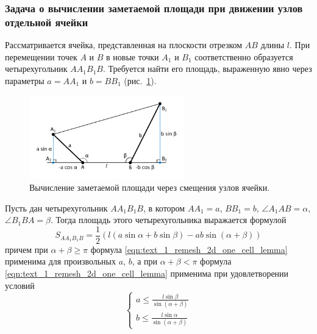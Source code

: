 \subsubsection{Задача о вычислении заметаемой площади при движении узлов отдельной ячейки}

Рассматривается ячейка, представленная на плоскости отрезком $AB$ длины $l$.
При перемещении точек $A$ и $B$ в новые точки $A_1$ и $B_1$ соответственно образуется четырехугольник $AA_1B_1B$.
Требуется найти его площадь, выраженную явно через параметры $a = AA_1$ и $b = BB_1$ (рис.~\ref{fig:text_1_remesh_2d_local}).

\begin{figure}[ht]
\centering
\includegraphics[width=0.6\textwidth]{pics/text_1_remesh_2d/local.pdf}
\singlespacing
{}\caption{Вычисление заметаемой площади через смещения узлов ячейки.}
\label{fig:text_1_remesh_2d_local}
\end{figure}

\begin{lemma}
Пусть дан четырехугольник $AA_1B_1B$, в котором $AA_1 = a$, $BB_1 = b$, $\angle A_1AB = \alpha$, $\angle B_1BA = \beta$.
Тогда площадь этого четырехугольника выражается формулой
\begin{equation}\label{eqn:text_1_remesh_2d_one_cell_lemma}
S_{AA_1B_1B} = \frac{1}{2} \left( l (a \sin \alpha + b \sin \beta) - ab \sin (\alpha + \beta) \right)
\end{equation}
причем при $\alpha + \beta \ge \pi$ формула \eqref{eqn:text_1_remesh_2d_one_cell_lemma} применима для произвольных $a$, $b$,
а при $\alpha + \beta < \pi$ формула \eqref{eqn:text_1_remesh_2d_one_cell_lemma} применима при удовлетворении условий
\begin{equation}\label{eqn:text_1_remesh_2d_one_cell_cond}
\begin{cases}
	a \le \frac{l \sin \beta}{\sin (\alpha + \beta)} \\
	b \le \frac{l \sin \alpha}{\sin (\alpha + \beta)}
\end{cases}
\end{equation}
\end{lemma}

